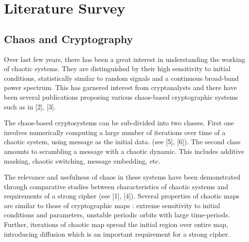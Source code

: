 \chapter{Literature Survey}
\label{chap:lit}
\setlength{\parskip}{1.5mm}
\section{Chaos and Cryptography}
Over last few years, there has been a great interest in understanding the working of chaotic systems. They are distinguished by their high sensitivity to initial conditions, statistically similar to random signals and a continuous broad-band power spectrum. This has garnered interest from cryptanalysts and there have been several publications proposing various chaos-based cryptographic systems such as in [2], [3].

The chaos-based cryptosystems can be sub-divided into two classes. First one involves numerically computing a large number of iterations over time of a chaotic system, using message as the initial data. (see [5], [6]). The second class amounts to scrambling a message with a chaotic dynamic. This includes additive masking, chaotic switching, message embedding, etc.

The relevance and usefulness of chaos in these systems have been demonstrated through comparative studies between characteristics of chaotic systems and requirements of a strong cipher (see [1], [4]). Several properties of chaotic maps are similar to those of cryptographic maps : extreme sensitivity to initial conditions and parameters, unstable periodic orbits with large time-periods. Further, iterations of chaotic map spread the initial region over entire map, introducing diffusion which is an important requirement for a strong cipher.

